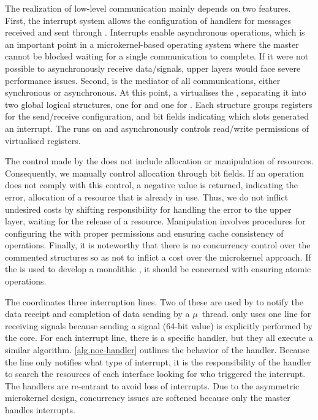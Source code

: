 			The realization of low-level communication mainly depends on two \mppa features.
			First, the interrupt system allows the configuration of handlers for messages
			received and sent through \noc. Interrupts enable asynchronous operations,
			which is an important point in a microkernel-based operating system where the
			master cannot be blocked waiting for a single communication to complete.
			If it were not possible to asynchronously receive
			data/signals, upper layers would face severe performance issues. Second,
			\dma is the mediator of all communications, either synchronous or asynchronous.
			At this point, a \hypervisor virtualises the \dma, separating it into two global
			logical structures, one for \cnoc and one for \dnoc. Each structure groups
			registers for the send/receive configuration, and bit fields indicating which
			slots generated an interrupt. The \hypervisor runs on \rms and asynchronously
			controls read/write permissions of virtualised registers.

			The control made by the \hypervisor does not include allocation or manipulation
			of resources. Consequently, we manually control allocation through bit fields.
			If an operation does not comply with this control, a negative value is returned,
			indicating the error, \eg allocation of a resource that is already in use.
			Thus, we do not inflict undesired costs by shifting responsibility for handling
			the error to the upper layer, \eg waiting for the release of a resource.
			Manipulation involves procedures for configuring the \dma with proper
			permissions and ensuring cache consistency of operations. Finally, it is
			noteworthy that there is no concurrency control over the commented
			structures so as not to inflict a cost over the microkernel approach.
			If the \nanvix \hal is used to develop a monolithic \os, it should be
			concerned with ensuring atomic operations.

			The \dma coordinates three interruption lines. Two of these are used by
			\dnoc to notify the data receipt and completion of data sending by a
			$\mu$~thread. \cnoc only uses one line for receiving signals because
			sending a signal (64-bit value) is explicitly performed by the core.
			For each interrupt line, there is a specific handler, but they all
			execute a similar algorithm. \autoref{alg.noc-handler} outlines
			the behavior of the \noc handler. Because the line only notifies what
			type of interrupt, it is the responsibility of the handler to search
			the resources of each interface looking for who triggered the interrupt.
			The handlers are re-entrant to avoid loss of interrupts. Due to the
			asymmetric microkernel design, concurrency issues are softened because only
			the master handles interrupts.


